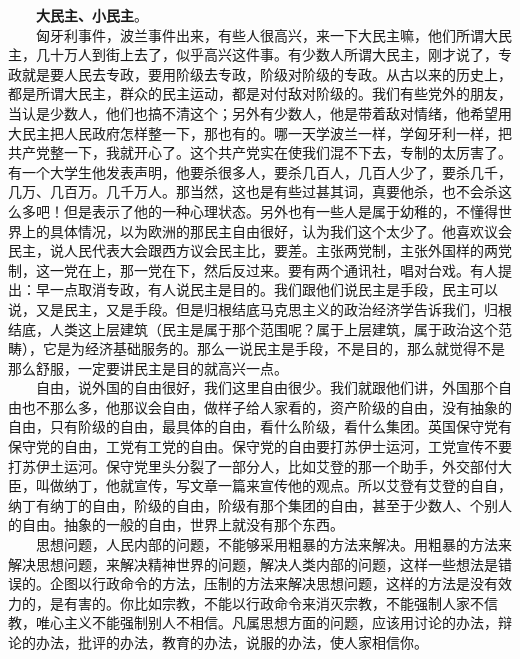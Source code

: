 \documentclass[cn,11pt,chinese]{elegantbook}
\begin{document}
　　\textbf{大民主、小民主}。\\
　　匈牙利事件，波兰事件出来，有些人很高兴，来一下大民主嘛，他们所谓大民主，几十万人到街上去了，似乎高兴这件事。有少数人所谓大民主，刚才说了，专政就是要人民去专政，要用阶级去专政，阶级对阶级的专政。从古以来的历史上，都是所谓大民主，群众的民主运动，都是对付敌对阶级的。我们有些党外的朋友，当认是少数人，他们也搞不清这个；另外有少数人，他是带着敌对情绪，他希望用大民主把人民政府怎样整一下，那也有的。哪一天学波兰一样，学匈牙利一样，把共产党整一下，我就开心了。这个共产党实在使我们混不下去，专制的太厉害了。有一个大学生他发表声明，他要杀很多人，要杀几百人，几百人少了，要杀几千，几万、几百万。几千万人。那当然，这也是有些过甚其词，真要他杀，也不会杀这么多吧！但是表示了他的一种心理状态。另外也有一些人是属于幼稚的，不懂得世界上的具体情况，以为欧洲的那民主自由很好，认为我们这个太少了。他喜欢议会民主，说人民代表大会跟西方议会民主比，要差。主张两党制，主张外国样的两党制，这一党在上，那一党在下，然后反过来。要有两个通讯社，唱对台戏。有人提出：早一点取消专政，有人说民主是目的。我们跟他们说民主是手段，民主可以说，又是民主，又是手段。但是归根结底马克思主义的政治经济学告诉我们，归根结底，人类这上层建筑（民主是属于那个范围呢？属于上层建筑，属于政治这个范畴），它是为经济基础服务的。那么一说民主是手段，不是目的，那么就觉得不是那么舒服，一定要讲民主是目的就高兴一点。\\
　　自由，说外国的自由很好，我们这里自由很少。我们就跟他们讲，外国那个自由也不那么多，他那议会自由，做样子给人家看的，资产阶级的自由，没有抽象的自由，只有阶级的自由，最具体的自由，看什么阶级，看什么集团。英国保守党有保守党的自由，工党有工党的自由。保守党的自由要打苏伊士运河，工党宣传不要打苏伊土运河。保守党里头分裂了一部分人，比如艾登的那一个助手，外交部付大臣，叫做纳丁，他就宣传，写文章一篇来宣传他的观点。所以艾登有艾登的自自，纳丁有纳丁的自由，阶级的自由，阶级有那个集团的自由，甚至于少数人、个别人的自由。抽象的一般的自由，世界上就没有那个东西。\\
　　思想问题，人民内部的问题，不能够采用粗暴的方法来解决。用粗暴的方法来解决思想问题，来解决精神世界的问题，解决人类内部的问题，这样一些想法是错误的。企图以行政命令的方法，压制的方法来解决思想问题，这样的方法是没有效力的，是有害的。你比如宗教，不能以行政命令来消灭宗教，不能强制人家不信教，唯心主义不能强制别人不相信。凡属思想方面的问题，应该用讨论的办法，辩论的办法，批评的办法，教育的办法，说服的办法，使人家相信你。\\
\end{document}

